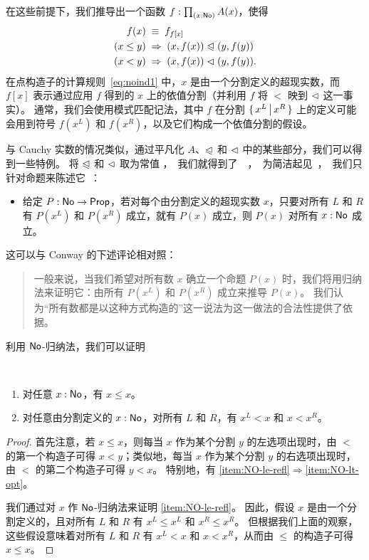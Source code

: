 在这些前提下，我们推导出一个函数 $f:\prd{x:\NO} A(x)$，使得
\begin{align}
  f(x) &\;\equiv\; f_{f[x]} \label{eq:noind1}\\
  (x\le y) &\;\Rightarrow\; (x,f(x)) \trianglelefteqslant (y,f(y)) \notag\\
  (x< y) &\;\Rightarrow\; (x,f(x)) \vartriangleleft (y,f(y)). \notag
\end{align}
在点构造子的计算规则~\eqref{eq:noind1} 中，$x$ 是由一个分割定义的超现实数，而 $f[x]$ 表示通过应用 $f$ 得到的 $x$ 上的依值分割（并利用 $f$ 将 $<$ 映到 $\vartriangleleft$ 这一事实）。
通常，我们会使用模式匹配记法，其中 $f$ 在分割 $\{\,x^L\,\big|\,x^R\,\}$ 上的定义可能会用到符号 $f(x^L)$ 和 $f(x^R)$，以及它们构成一个依值分割的假设。

与 Cauchy 实数的情况类似，通过平凡化 $A$、$\trianglelefteqslant$ 和 $\vartriangleleft$ 中的某些部分，我们可以得到一些特例。
将 $\trianglelefteqslant$ 和 $\vartriangleleft$ 取为常值 \unit，我们就得到了 ，为简洁起见，我们只针对命题来陈述它：

\begin{itemize}
\item 给定 $P:\mathsf{No}\to\mathsf{Prop}$，若对每个由分割定义的超现实数 $x$，只要对所有 $L$ 和 $R$ 有 $P(x^L)$ 和 $P(x^R)$ 成立，就有 $P(x)$ 成立，则 $P(x)$ 对所有 $x:\mathsf{No}$ 成立。
\end{itemize}

这可以与 Conway 的下述评论相对照：

\begin{quote}\footnotesize
  一般来说，当我们希望对所有数 $x$ 确立一个命题 $P(x)$ 时，我们将用归纳法来证明它：由所有 $P(x^L)$ 和 $P(x^R)$ 成立来推导 $P(x)$。
  我们认为``所有数都是以这种方式构造的''这一说法为这一做法的合法性提供了依据。
\end{quote}

利用 $\mathsf{No}$-归纳法，我们可以证明

\begin{thm}[Conway 定理 0]\label{thm:NO-refl-opt}\
  \begin{enumerate}
  \item 对任意 $x:\mathsf{No}$，有 $x\le x$。\label{item:NO-le-refl}
  \item 对任意由分割定义的 $x:\mathsf{No}$，对所有 $L$ 和 $R$，有 $x^L <x$ 和 $x<x^R$。\label{item:NO-lt-opt}
  \end{enumerate}
\end{thm}

\begin{proof}
  首先注意，若 $x\le x$，则每当 $x$ 作为某个分割 $y$ 的左选项出现时，由 $<$ 的第一个构造子可得 $x<y$；类似地，每当 $x$ 作为某个分割 $y$ 的右选项出现时，由 $<$ 的第二个构造子可得 $y<x$。
  特别地，有 \ref{item:NO-le-refl}$\Rightarrow$\ref{item:NO-lt-opt}。

  我们通过对 $x$ 作 $\mathsf{No}$-归纳法来证明 \ref{item:NO-le-refl}。
  因此，假设 $x$ 是由一个分割定义的，且对所有 $L$ 和 $R$ 有 $x^L\le x^L$ 和 $x^R \le x^R$。
  但根据我们上面的观察，这些假设意味着对所有 $L$ 和 $R$ 有 $x^L<x$ 和 $x<x^R$，从而由 $\le$ 的构造子可得 $x\le x$。
\end{proof}

